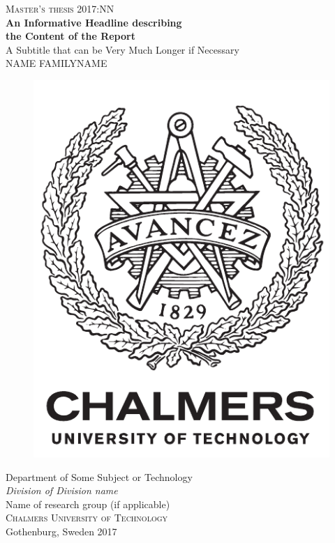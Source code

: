 \newpage
\restoregeometry
\thispagestyle{empty}
\mbox{}


\newpage
\thispagestyle{empty}
\begin{center}
	\textsc{\large Master's thesis 2017:NN}\\[4cm]		%
	\textbf{\Large An Informative Headline describing\\ the Content of the Report} \\[1cm]
	{\large A Subtitle that can be Very Much Longer if Necessary}\\[1cm]
	{\large NAME FAMILYNAME}
	
	\vfill	
	\begin{figure}[H]
	\centering
	\includegraphics[width=0.2\pdfpagewidth]{figure/auxiliary/logo_eng.pdf} \\	
	\end{figure}	\vspace{5mm}	
	
	Department of Some Subject or Technology \\
	\emph{Division of Division name}\\
	Name of research group (if applicable)\\
	\textsc{Chalmers University of Technology} \\
	Gothenburg, Sweden 2017 \\
\end{center}


